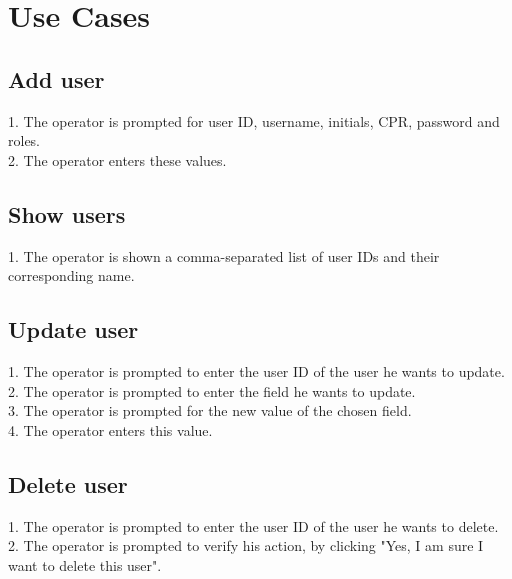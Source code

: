 \section{Use Cases}
\subsection{Add user}
1. The operator is prompted for user ID, username, initials, CPR, password and roles.\\
2. The operator enters these values.

\subsection{Show users}
1. The operator is shown a comma-separated list of user IDs and their corresponding name.

\subsection{Update user}
1. The operator is prompted to enter the user ID of the user he wants to update.\\
2. The operator is prompted to enter the field he wants to update.\\
3. The operator is prompted for the new value of the chosen field.\\
4. The operator enters this value.

\subsection{Delete user}
1. The operator is prompted to enter the user ID of the user he wants to delete.\\
2. The operator is prompted to verify his action, by clicking "Yes, I am sure I want to delete this user".